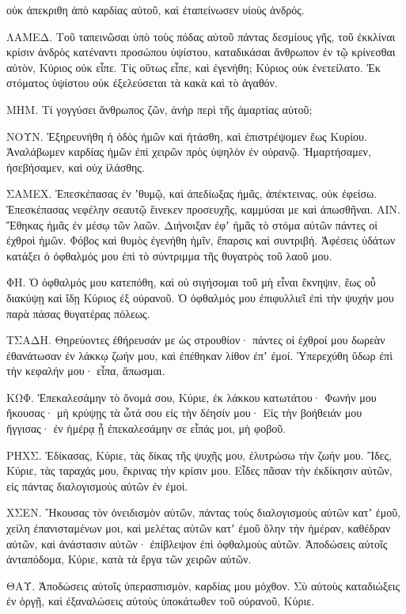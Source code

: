 {οὐκ ἀπεκριθη ἀπὸ καρδίας αὐτοῦ, καὶ ἐταπείνωσεν υἱοὺς ἀνδρός.
\par }{\PP {}ΛΑΜΕΔ. Τοῦ ταπεινῶσαι ὑπὸ τοὺς πόδας αὐτοῦ πάντας δεσμίους γῆς,
τοῦ ἐκκλίναι κρίσιν ἀνδρὸς κατέναντι προσώπου ὑψίστου,
καταδικάσαι ἄνθρωπον ἐν τῷ κρίνεσθαι αὐτὸν, Κύριος οὐκ εἶπε.
Τίς οὕτως εἶπε, καὶ ἐγενήθη; Κύριος οὐκ ἐνετείλατο.
Ἐκ στόματος ὑψίστου οὐκ ἐξελεύσεται τὰ κακὰ καὶ τὸ ἀγαθόν.
\par }{\PP {}ΜΗΜ. Τί γογγύσει ἄνθρωπος ζῶν, ἀνὴρ περὶ τῆς ἁμαρτίας αὐτοῦ;
\par }{\PP {}ΝΟΥΝ. Ἐξηρευνήθη ἡ ὁδὸς ἡμῶν καὶ ἠτάσθη, καὶ ἐπιστρέψομεν ἕως Κυρίου.
Ἀναλάβωμεν καρδίας ἡμῶν ἐπὶ χειρῶν πρὸς ὑψηλὸν ἐν οὐρανῷ.
Ἡμαρτήσαμεν, ἠσεβήσαμεν, καὶ οὐχ ἱλάσθης.
\par }{\PP {}ΣΑΜΕΧ. Ἐπεσκέπασας ἐν ʼθυμῷ, καὶ ἀπεδίωξας ἡμᾶς, ἀπέκτεινας, οὐκ ἐφείσω.
Ἐπεσκέπασας νεφέλην σεαυτῷ ἕινεκεν προσευχῆς,
καμμύσαι με καὶ ἀπωσθῆναι. ΑΙΝ. Ἔθηκας ἡμᾶς ἐν μέσῳ τῶν λαῶν.
Διήνοιξαν ἐφʼ ἡμᾶς τὸ στόμα αὐτῶν πάντες οἱ ἐχθροὶ ἡμῶν.
Φόβος καὶ θυμὸς ἐγενήθη ἡμῖν, ἔπαρσις καὶ συντριβή.
Ἀφέσεις ὑδάτων κατάξει ὁ ὀφθαλμός μου ἐπὶ τὸ σύντριμμα τῆς θυγατρὸς τοῦ λαοῦ μου.
\par }{\PP {}ΦΗ. Ὁ ὀφθαλμός μου κατεπόθη, καὶ οὐ σιγήσομαι τοῦ μὴ εἶναι ἔκνηψιν,
ἕως οὗ διακύψῃ καὶ ἴδῃ Κύριος ἐξ οὐρανοῦ.
Ὁ ὀφθαλμός μου ἐπιφυλλιεῖ ἐπὶ τὴν ψυχήν μου παρὰ πάσας θυγατέρας πόλεως.
\par }{\PP {}ΤΣΑΔΗ. Θηρεύοντες ἐθήρευσάν με ὡς στρουθίον· πάντες οἱ ἐχθροί μου δωρεὰν
ἐθανάτωσαν ἐν λάκκῳ ζωήν μου, καὶ ἐπέθηκαν λίθον ἐπʼ ἐμοί.
Ὑπερεχύθη ὕδωρ ἐπὶ τὴν κεφαλήν μου· εἶπα, ἄπωσμαι.
\par }{\PP {}ΚΩΦ. Ἐπεκαλεσάμην τὸ ὄνομά σου, Κύριε, ἐκ λάκκου κατωτάτου·
Φωνήν μου ἤκουσας· μὴ κρύψῃς τὰ ὦτά σου εἰς τὴν δέησίν μου·
Εἰς τὴν βοήθειάν μου ἤγγισας· ἐν ἡμέρᾳ ᾗ ἐπεκαλεσάμην σε εἶπάς μοι, μὴ φοβοῦ.
\par }{\PP {}ΡΗΧΣ. Ἐδίκασας, Κύριε, τὰς δίκας τῆς ψυχῆς μου, ἐλυτρώσω τὴν ζωήν μου.
Ἴδες, Κύριε, τὰς ταραχάς μου, ἔκρινας τὴν κρίσιν μου.
Εἶδες πᾶσαν τὴν ἐκδίκησιν αὐτῶν, εἰς πάντας διαλογισμοὺς αὐτῶν ἐν ἐμοί.
\par }{\PP {}ΧΣΕΝ. Ἤκουσας τὸν ὀνειδισμὸν αὐτῶν, πάντας τοὺς διαλογισμοὺς αὐτῶν κατʼ ἐμοῦ,
χείλη ἐπανισταμένων μοι, καὶ μελέτας αὐτῶν κατʼ ἐμοῦ ὅλην τὴν ἡμέραν,
καθέδραν αὐτῶν, καὶ ἀνάστασιν αὐτῶν· ἐπίβλεψον ἐπὶ ὀφθαλμοὺς αὐτῶν.
Ἀποδώσεις αὐτοῖς ἀνταπόδομα, Κύριε, κατὰ τὰ ἔργα τῶν χειρῶν αὐτῶν.
\par }{\PP {}ΘΑΥ. Ἀποδώσεις αὐτοῖς ὑπερασπισμὸν, καρδίας μου μόχθον.
Σὺ αὐτοὺς καταδιώξεις ἐν ὀργῇ, καὶ ἐξαναλώσεις αὐτοὺς ὑποκάτωθεν τοῦ οὐρανοῦ, Κύριε.

}
